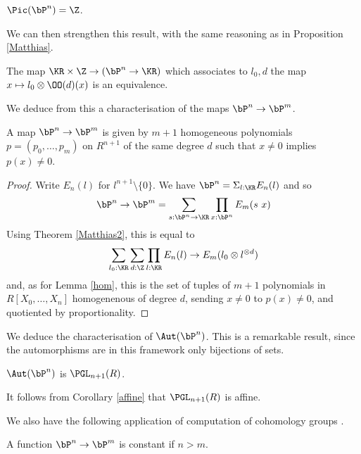\begin{corollary}
  $\Pic(\bP^n) = \Z$.
\end{corollary}

We can then strengthen this result, with the same reasoning as in Proposition \ref{Matthias}.

\begin{theorem}\label{Matthias2}
  The map $\KR\times\Z\rightarrow (\bP^n\rightarrow \KR)$
  which associates to $l_0,d$ the map $x\mapsto l_0\otimes \OO(d)(x)$ is an equivalence.
\end{theorem}

We deduce from this a characterisation of the maps $\bP^n\rightarrow\bP^m$.%

\begin{corollary}\label{map}
  A map $\bP^n\rightarrow\bP^m$ is given by $m+1$ homogeneous polynomials $p = (p_0,\dots,p_m)$ on $R^{n+1}$
  of the same   degree $d$ such that $x\neq 0$ implies $p(x)\neq 0$.
\end{corollary}

\begin{proof}
Write $E_n(l)$ for $l^{n+1}\setminus\{0\}$. We have $\bP^n = \Sigma_{l:\KR}E_n(l)$ and so
$$
\bP^n\rightarrow\bP^m = \sum_{s:\bP^n\rightarrow \KR}\prod_{x:\bP^n}E_m(s~x)
$$
Using Theorem \ref{Matthias2}, this is equal to
$$
\sum_{l_0:\KR}\sum_{d:\Z}\prod_{l:\KR}E_n(l)\rightarrow E_m(l_0\otimes l^{\otimes d})
$$
and, as for Lemma \ref{hom}, this is the set of tuples of $m+1$ polynomials in $R[X_0,\dots,X_n]$ homogenenous
of degree $d$, sending $x\neq 0$ to $p(x)\neq 0$, and quotiented by proportionality.
\end{proof}

We deduce the characterisation of $\Aut(\bP^n)$. This is a
remarkable result, since the automorphisms are in this framework only bijections of sets.

\begin{corollary}
  $\Aut(\bP^n)$ is $\PGL_{n+1}(R)$.
\end{corollary}

It follows from Corollary \ref{affine} that $\PGL_{n+1}(R)$ is affine.

We also have the following application of computation of cohomology groups \cite{draft}.

\begin{corollary}
A function $\bP^n\rightarrow\bP^m$ is constant if $n>m$.
\end{corollary}

